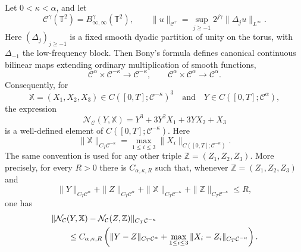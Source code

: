 \begin{proposition}
\label{prop:spde-dpd-besov-product-continuity}
Let \(0<\kappa<\alpha\), and let
\[
  \mathcal C^\gamma(\mathbb T^2)=B^\gamma_{\infty,\infty}(\mathbb T^2),
  \qquad
  \|u\|_{\mathcal C^\gamma}
  =
  \sup_{j\geq -1}2^{j\gamma}\|\Delta_j u\|_{L^\infty}.
\]
Here \((\Delta_j)_{j\geq -1}\) is a fixed smooth dyadic partition of unity
on the torus, with \(\Delta_{-1}\) the low-frequency block.  Then Bony's
formula defines canonical continuous bilinear maps extending ordinary
multiplication of smooth functions,
\[
  \mathcal C^\alpha\times\mathcal C^{-\kappa}
  \longrightarrow
  \mathcal C^{-\kappa},
  \qquad
  \mathcal C^\alpha\times\mathcal C^\alpha
  \longrightarrow
  \mathcal C^\alpha .
\]
Consequently, for
\[
  \mathbb X=(X_1,X_2,X_3)\in C([0,T];\mathcal C^{-\kappa})^3
  \quad\text{and}\quad
  Y\in C([0,T];\mathcal C^\alpha),
\]
the expression
\[
  \mathcal N_{\mathcal C}(Y,\mathbb X)
  =
  Y^3+3Y^2X_1+3YX_2+X_3
\]
is a well-defined element of
\(C([0,T];\mathcal C^{-\kappa})\).  Here
\[
  \|\mathbb X\|_{C_T\mathcal C^{-\kappa}}
  =
  \max_{1\leq i\leq3}
  \|X_i\|_{C([0,T];\mathcal C^{-\kappa})}.
\]
The same convention is used for any other triple
\(\mathbb Z=(Z_1,Z_2,Z_3)\).
More precisely, for every \(R>0\)
there is \(C_{\alpha,\kappa,R}\) such that, whenever
\(\mathbb Z=(Z_1,Z_2,Z_3)\) and
\[
  \|Y\|_{C_T\mathcal C^\alpha}
  +\|Z\|_{C_T\mathcal C^\alpha}
  +\|\mathbb X\|_{C_T\mathcal C^{-\kappa}}
  +\|\mathbb Z\|_{C_T\mathcal C^{-\kappa}}
  \leq R ,
\]
one has
\begin{align}
  &\|\mathcal N_{\mathcal C}(Y,\mathbb X)
      -\mathcal N_{\mathcal C}(Z,\mathbb Z)\|_{C_T\mathcal C^{-\kappa}}
  \notag\\
  &\qquad\leq
  C_{\alpha,\kappa,R}
  \left(
    \|Y-Z\|_{C_T\mathcal C^\alpha}
    +
    \max_{1\leq i\leq3}
    \|X_i-Z_i\|_{C_T\mathcal C^{-\kappa}}
  \right).
  \label{eq:spde-dpd-besov-nonlinearity-continuity}
\end{align}
\end{proposition}


